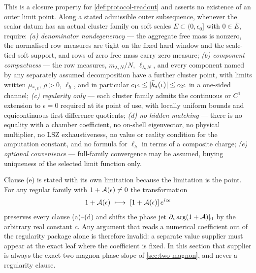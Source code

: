 
\begin{definition}
\label{def:protocol-regularity}
\statusProposed

This is a closure property for \cref{def:protocol-readout} and asserts no
existence of an outer limit point. Along a stated admissible outer
subsequence, whenever the scalar datum has an actual cluster family on soft
scales $E\subset(0,\epsilon_0]$ with $0\in\overline E$, require:
\emph{(a) denominator nondegeneracy} --- the aggregate free mass is nonzero,
the normalised row measures are tight on the fixed hard window and the
scale-tied soft support, and rows of zero free mass carry zero measure;
\emph{(b) component compactness} --- the row measures, $m_{\lambda,N}/N$,
$\ell_{\lambda,N}$, and every component named by any separately assumed
decomposition have a further cluster point, with limits written
$\mu_{*,\epsilon}$, $\rho>0$, $\ell_h$, and in particular
$c_1\epsilon\le\lvert \bar k_*(\epsilon)\rvert\le c_2\epsilon$ in a one-sided
channel; \emph{(c) regularity only} --- each cluster family admits the
continuous or $C^1$ extension to $\epsilon=0$ required at its point of use,
with locally uniform bounds and equicontinuous first difference quotients;
\emph{(d) no hidden matching} --- there is no equality with a chamber
coefficient, no on-shell eigenvector, no physical multiplier, no LSZ
exhaustiveness, no value or reality condition for the amputation constant, and
no formula for $\ell_h$ in terms of a composite charge; \emph{(e) optional
convenience} --- full-family convergence may be assumed, buying uniqueness of
the selected limit function only.
\end{definition}

\begin{scope}
\label{scope:regularity-no-value}
Clause (e) is stated with its own limitation because the limitation is the
point. For any regular family with $1+\mathcal{A}(\epsilon)\neq0$ the
transformation
\begin{equation}
  1+\Aproto(\epsilon)\ \longmapsto\ [1+\Aproto(\epsilon)]\,e^{ic\epsilon}
  \label{eq:mobius-shift}
\end{equation}
preserves every clause (a)--(d) and shifts the phase jet
$\partial_\epsilon\arg(1+\mathcal{A})|_0$ by the arbitrary real constant $c$. Any
argument that reads a numerical coefficient out of the regularity package
alone is therefore invalid: a separate value supplier must appear at the exact
leaf where the coefficient is fixed. In this section that supplier is always
the exact two-magnon phase slope of \cref{sec:two-magnon}, and never a
regularity clause.
\end{scope}

